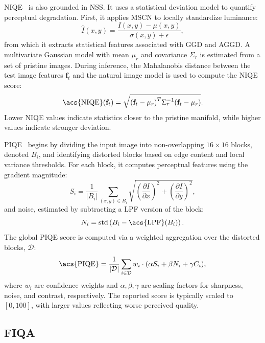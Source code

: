 \acf{NIQE}~\cite{mittal2012niqe} is also grounded in \acs{NSS}. It uses a statistical deviation model to quantify perceptual degradation. First, it applies \acs{MSCN} to locally standardize luminance:
\begin{equation}
\hat{I}(x, y) = \frac{I(x, y) - \mu(x, y)}{\sigma(x, y) + \epsilon},
\end{equation}
from which it extracts statistical features associated with \acs{GGD} and \acs{AGGD}. A multivariate Gaussian model with mean $\mu_r$ and covariance $\Sigma_r$ is estimated from a set of pristine images. During inference, the Mahalanobis distance between the test image features $\mathbf{f}_t$ and the natural image model is used to compute the \acs{NIQE} score:
\begin{equation}
\text{\acs{NIQE}}(\mathbf{f}_t) = \sqrt{ {(\mathbf{f}_t - \mu_r)}^T \Sigma_r^{-1} (\mathbf{f}_t - \mu_r) }.
\end{equation}
Lower \acs{NIQE} values indicate statistics closer to the pristine manifold, while higher values indicate stronger deviation.

\acf{PIQE}~\cite{venka2015piqe} begins by dividing the input image into non-overlapping $16 \times 16$ blocks, denoted $B_i$, and identifying distorted blocks based on edge content and local variance thresholds. For each block, it computes perceptual features using the gradient magnitude:
\begin{equation}
S_i = \frac{1}{|B_i|} \sum_{(x,y) \in B_i} \sqrt{ {\left( \frac{\partial I}{\partial x} \right)}^2 + {\left( \frac{\partial I}{\partial y} \right)}^2 },
\end{equation}
and noise, estimated by subtracting a \acf{LPF} version of the block:
\begin{equation}
N_i = \text{std}\left( B_i - \text{\acs{LPF}}(B_i) \right).
\end{equation}
The global \acs{PIQE} score is computed via a weighted aggregation over the distorted blocks, $\mathcal{D}$:
\begin{equation}
\text{\acs{PIQE}} = \frac{1}{|\mathcal{D}|} \sum_{i \in \mathcal{D}} w_i \cdot ( \alpha S_i + \beta N_i + \gamma C_i ),
\end{equation}
where $w_i$ are confidence weights and $\alpha, \beta, \gamma$ are scaling factors for sharpness, noise, and contrast, respectively. The reported score is typically scaled to $[0,100]$, with larger values reflecting worse perceived quality.

\subsection{\acl{FIQA}}\label{sec:fiqa}

